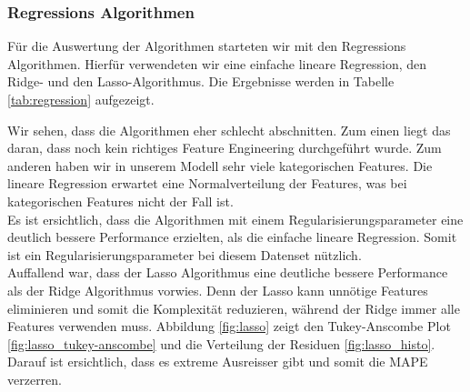 \subsubsection{Regressions Algorithmen}
Für die Auswertung der Algorithmen starteten wir mit den Regressions Algorithmen. Hierfür verwendeten wir eine  einfache lineare Regression, den Ridge- und den Lasso-Algorithmus. Die Ergebnisse werden in Tabelle \ref{tab:regression} aufgezeigt.

\begin{table}[h]
\centering
{}
\caption{Ergebnisse der Regression Algorithmen}
\label{tab:regression}
\end{table}

Wir sehen, dass die Algorithmen eher schlecht abschnitten. Zum einen liegt das daran, dass noch kein richtiges Feature Engineering durchgeführt wurde. Zum anderen haben wir in unserem Modell sehr viele kategorischen Features. Die lineare Regression erwartet eine Normalverteilung der Features, was bei kategorischen Features nicht der Fall ist.\\
Es ist ersichtlich, dass die Algorithmen mit einem Regularisierungsparameter eine deutlich bessere Performance erzielten, als die einfache lineare Regression. Somit ist ein Regularisierungsparameter bei diesem Datenset nützlich.\\
Auffallend war, dass der Lasso Algorithmus eine deutliche bessere Performance als der Ridge Algorithmus vorwies. Denn der Lasso kann unnötige Features eliminieren und somit die Komplexität reduzieren, während der Ridge immer alle Features verwenden muss. Abbildung \ref{fig:lasso} zeigt den Tukey-Anscombe Plot \ref{fig:lasso_tukey-anscombe} und die Verteilung der Residuen \ref{fig:lasso_histo}. Darauf ist ersichtlich, dass es extreme Ausreisser gibt und somit die MAPE verzerren.

